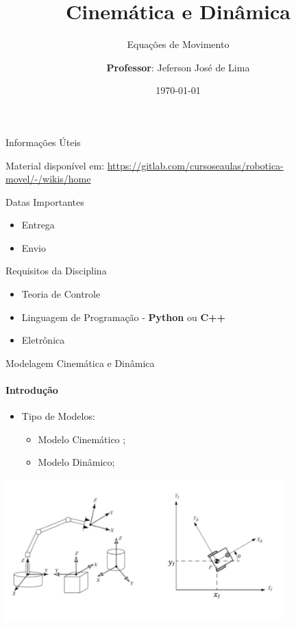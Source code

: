 \documentclass{beamer}
\title{Cinemática e Dinâmica}
\subtitle{Equações de Movimento}
\date{\today}
\author[Jeferson José de Lima]{
  \textbf{Professor}: Jeferson José de Lima}
\institute[UTFPR-PB]{Departamento de Informática (DAINF)}
\newcommand{\cmark}{\textcolor{green}{\ding{51}}}%
\newcommand{\pausar}{\pause}
\begin{document}
\maketitle

\begin{frame}{Informações Úteis}
    \begin{block}{Material disponível em:}
        \href{Robótica Móvel - Wiki}{https://gitlab.com/cursoseaulas/robotica-movel/-/wikis/home}
    \end{block}
    \pausar
    \begin{block}{Datas Importantes}
        \begin{itemize}
            \item Entrega
            \item Envio
        \end{itemize}
    \end{block}
    \pausar
    \begin{block}{Requisitos da Disciplina}
        \begin{itemize}
            \item Teoria de Controle
            \item Linguagem de Programação - \textbf{Python} ou \textbf{C++}
            \item Eletrônica
        \end{itemize}
    \end{block}
    \robotfolder
    
\end{frame}


\begin{frame}{Modelagem Cinemática e Dinâmica}
    \framesubtitle{Introdução}
    \begin{itemize}
        \item Tipo de Modelos:
              \begin{itemize}
                  \item Modelo Cinemático \cmark;
                  \item Modelo Dinâmico;
              \end{itemize}
    \end{itemize}
    \begin{center}
        \includegraphics[width=0.8\textwidth]{./images/mecanismos.jpg}
    \end{center}
\end{frame}
\end{document}
